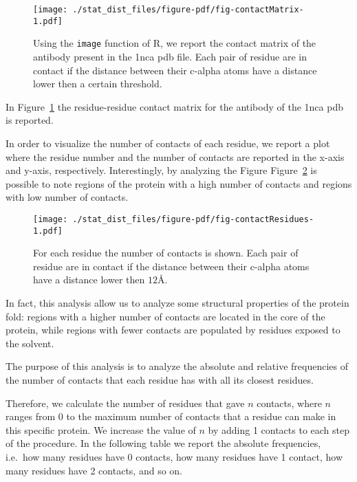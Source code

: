 \documentclass[
  letterpaper,
  DIV=11,
  numbers=noendperiod]{scrreprt}
\begin{document}
\begin{figure}

{\centering \texttt{[image: ./stat\_dist\_files/figure-pdf/fig-contactMatrix-1.pdf]}

}

\caption{\label{fig-contactMatrix}Using the \texttt{image} function of
R, we report the contact matrix of the antibody present in the 1nca pdb
file. Each pair of residue are in contact if the distance between their
c-alpha atoms have a distance lower then a certain threshold.}

\end{figure}

In Figure~\ref{fig-contactMatrix} the residue-residue contact matrix for
the antibody of the 1nca pdb is reported.

In order to visualize the number of contacts of each residue, we report
a plot where the residue number and the number of contacts are reported
in the x-axis and y-axis, respectively. Interestingly, by analyzing the
Figure Figure~\ref{fig-contactResidues} is possible to note regions of
the protein with a high number of contacts and regions with low number
of contacts.

\begin{figure}

{\centering \texttt{[image: ./stat\_dist\_files/figure-pdf/fig-contactResidues-1.pdf]}

}

\caption{\label{fig-contactResidues}For each residue the number of
contacts is shown. Each pair of residue are in contact if the distance
between their c-alpha atoms have a distance lower then \(12 Å\).}

\end{figure}

In fact, this analysis allow us to analyze some structural properties of
the protein fold: regions with a higher number of contacts are located
in the core of the protein, while regions with fewer contacts are
populated by residues exposed to the solvent.

The purpose of this analysis is to analyze the absolute and relative
frequencies of the number of contacts that each residue has with all its
closest residues.

Therefore, we calculate the number of residues that gave \(n\) contacts,
where \(n\) ranges from 0 to the maximum number of contacts that a
residue can make in this specific protein. We increase the value of
\(n\) by adding 1 contacts to each step of the procedure. In the
following table we report the absolute frequencies, i.e.~how many
residues have 0 contacts, how many residues have 1 contact, how many
residues have 2 contacts, and so on.
\end{document}
